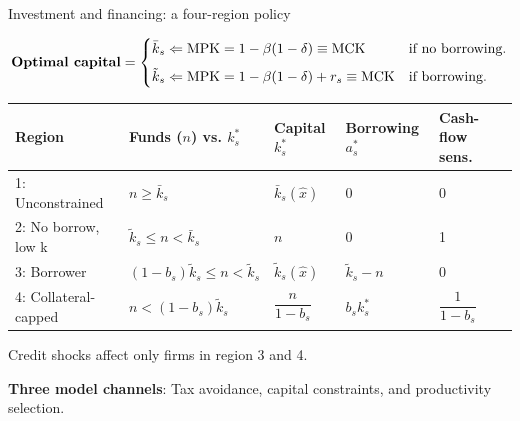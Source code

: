 \documentclass[aspectratio=169]{beamer}
\begin{document}
 
\begin{frame}{Investment and financing: a four-region policy}
 
\[
\text{\textbf{Optimal capital}} =
\begin{cases}
    \bar{k}_{s}
    \Leftarrow \mathrm{MPK}
    = 1-\beta(1-\delta) \equiv \mathrm{MCK}
    & \text{if no borrowing.} \\[6pt]
    \tilde{k}_{s}
    \Leftarrow \mathrm{MPK}
    = 1-\beta(1-\delta)+r_s \equiv \mathrm{MCK}
    & \text{if borrowing.}
\end{cases}
\]
 
\vspace{3mm}
 
\begin{center}
    \renewcommand{\arraystretch}{1.25}\small
    \begin{tabular}{lllll}
        \toprule
         Region & Funds ($n$) vs. $k^{*}_{s}$ & Capital $k^{*}_{s}$ &
         Borrowing $a^{*}_{s}$ & Cash-flow sens.\ \\
        \midrule
        1: Unconstrained & $n\geq\bar k_{s}$ & $\bar k_{s}(\hat{x})$
         & 0 & 0 \\
        2: No borrow, low k & $\tilde k_{s}\leq n<\bar k_{s}$ &
         $n$ & 0 & 1 \\
        3: Borrower & $(1-b_{s})\tilde k_{s}\leq n
         <\tilde k_{s}$ & $\tilde k_{s}(\hat{x})$ & $\tilde k_{s}-n$
         & 0 \\
        4: Collateral-capped & $n<(1-b_{s})\tilde k_{s}$ &
         $\dfrac{n}{1-b_{s}}$ & $b_{s}k^{*}_{s}$ &
         $\dfrac{1}{1-b_{s}}$ \\
        \bottomrule
    \end{tabular}
\end{center}
 
\vspace{2mm}
\pause
 
 Credit shocks affect only firms in region 3 and 4.
 
\vspace{2mm}
\pause
 
\textbf{Three model channels}: Tax avoidance, capital constraints, and productivity selection.
 
\end{frame}
 
 
\end{document}
